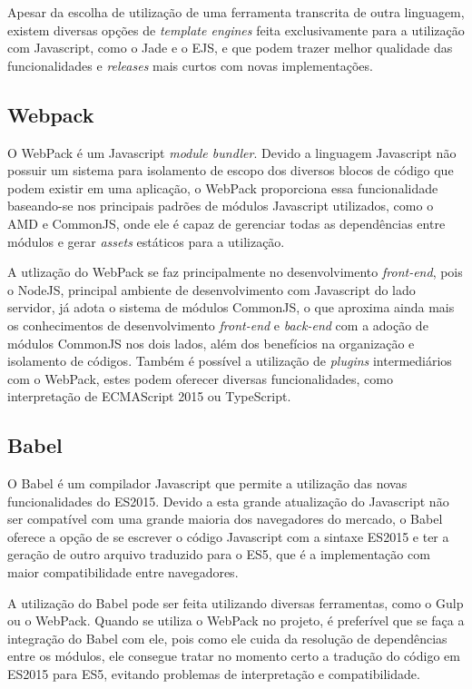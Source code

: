 Apesar da escolha de utilização de uma ferramenta transcrita de outra linguagem, existem diversas opções de \textit{template engines} feita exclusivamente para a utilização com Javascript, como o Jade e o EJS, e que podem trazer melhor qualidade das funcionalidades e \textit{releases} mais curtos com novas implementações.

\subsection{Webpack}
O WebPack \cite{webpack} é um Javascript \textit{module bundler}. Devido a linguagem Javascript não possuir um sistema para isolamento de escopo dos diversos blocos de código que podem existir em uma aplicação, o WebPack proporciona essa funcionalidade baseando-se nos principais padrões de módulos Javascript utilizados, como o AMD e CommonJS, onde ele é capaz de gerenciar todas as dependências entre módulos e gerar \textit{assets} estáticos para a utilização.

A utlização do WebPack se faz principalmente no desenvolvimento \textit{front-end}, pois o NodeJS, principal ambiente de desenvolvimento com Javascript do lado servidor, já adota o sistema de módulos CommonJS, o que aproxima ainda mais os conhecimentos de desenvolvimento \textit{front-end} e \textit{back-end} com a adoção de módulos CommonJS nos dois lados, além dos benefícios na organização e isolamento de códigos. Também é possível a utilização de \textit{plugins} intermediários com o WebPack, estes podem oferecer diversas funcionalidades, como interpretação de ECMAScript 2015 ou TypeScript.

\subsection{Babel}
O Babel \cite{babel} é um compilador Javascript que permite a utilização das novas funcionalidades do ES2015. Devido a esta grande atualização do Javascript não ser compatível com uma grande maioria dos navegadores do mercado, o Babel oferece a opção de se escrever o código Javascript com a sintaxe ES2015 e ter a geração de outro arquivo traduzido para o ES5, que é a implementação com maior compatibilidade entre navegadores.

A utilização do Babel pode ser feita utilizando diversas ferramentas, como o Gulp ou o WebPack. Quando se utiliza o WebPack no projeto, é preferível que se faça a integração do Babel com ele, pois como ele cuida da resolução de dependências entre os módulos, ele consegue tratar no momento certo a tradução do código em ES2015 para ES5, evitando problemas de interpretação e compatibilidade. 

